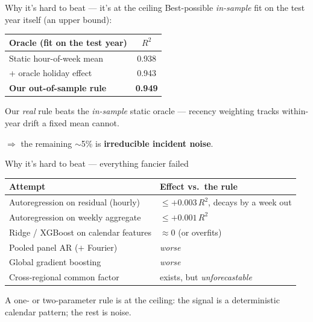 \documentclass[aspectratio=169,11pt]{beamer}
\begin{document}
\begin{frame}{Why it's hard to beat --- it's at the ceiling}
  Best-possible \emph{in-sample} fit on the test year itself (an upper bound):
  \vfill
  \centering
  \begin{tabular}{lc}
    \toprule
    Oracle (fit on the test year) & $R^2$ \\
    \midrule
    Static hour-of-week mean        & 0.938 \\
    \; + oracle holiday effect      & 0.943 \\
    \textbf{Our out-of-sample rule} & \textbf{0.949} \\
    \bottomrule
  \end{tabular}
  \vfill
  \raggedright
  Our \emph{real} rule beats the \emph{in-sample} static oracle --- recency
  weighting tracks within-year drift a fixed mean cannot.
  \smallskip

  $\Rightarrow$ the remaining $\sim$5\% is \textbf{irreducible incident noise}.
\end{frame}

\begin{frame}{Why it's hard to beat --- everything fancier failed}
  \centering
  \begin{tabular}{ll}
    \toprule
    Attempt & Effect vs.\ the rule \\
    \midrule
    Autoregression on residual (hourly)   & $\le +0.003\,R^2$, decays by a week out \\
    Autoregression on weekly aggregate    & $\le +0.001\,R^2$ \\
    Ridge / XGBoost on calendar features  & $\approx 0$ (or overfits) \\
    Pooled panel AR ($+$ Fourier)         & \emph{worse} \\
    Global gradient boosting              & \emph{worse} \\
    Cross-regional common factor          & exists, but \emph{unforecastable} \\
    \bottomrule
  \end{tabular}
  \vfill
  \centering
  \alert{A one- or two-parameter rule is at the ceiling:} the signal is a
  deterministic calendar pattern; the rest is noise.
\end{frame}
\end{document}
